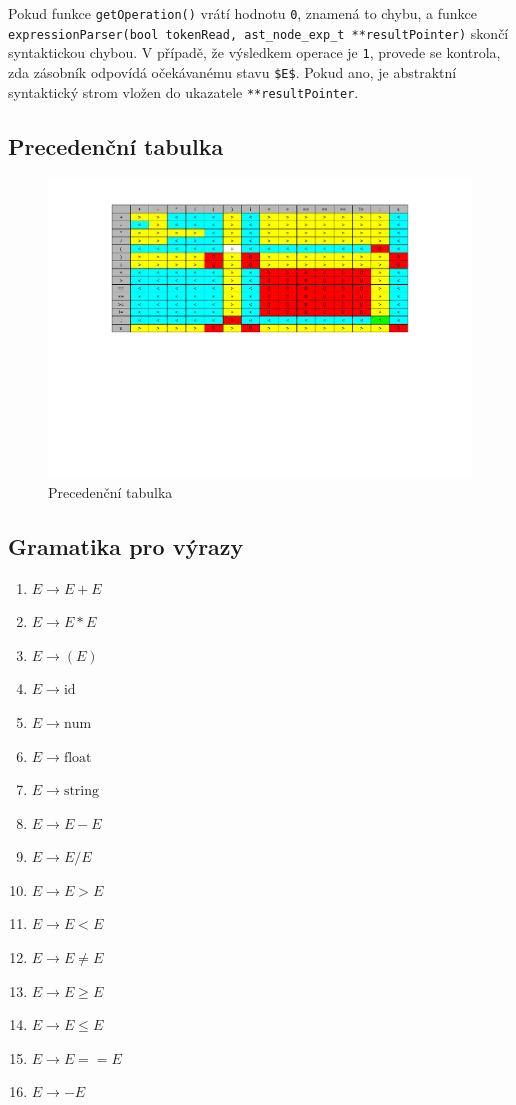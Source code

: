 \documentclass[a4paper, 12pt]{article}
\begin{document}
Pokud funkce \texttt{getOperation()} vrátí hodnotu \texttt{0}, znamená to chybu, a funkce \texttt{expressionParser(bool tokenRead, ast\_node\_exp\_t **resultPointer)} skončí syntaktickou chybou. V případě, že výsledkem operace je \texttt{1}, provede se kontrola, zda zásobník odpovídá očekávanému stavu \texttt{\$E\$}. Pokud ano, je abstraktní syntaktický strom vložen do ukazatele \texttt{**resultPointer}.


\subsection{Precedenční tabulka}
\begin{figure}[ht!]
\begin{center}
  \includegraphics[width=1\textwidth]{images/precedence_table.pdf}
  \caption{Precedenční tabulka}
\end{center}
\end{figure}

\newpage

\subsection{Gramatika pro výrazy}

\begin{enumerate}
    \item $E \to E + E$
    \item $E \to E * E$
    \item $E \to (E)$
    \item $E \to \text{id}$
    \item $E \to \text{num}$
    \item $E \to \text{float}$
    \item $E \to \text{string}$
    \item $E \to E - E$
    \item $E \to E / E$
    \item $E \to E > E$
    \item $E \to E < E$
    \item $E \to E \neq E$
    \item $E \to E \geq E$
    \item $E \to E \leq E$
    \item $E \to E == E$
    \item $E \to -E$
\end{enumerate}
\end{document}
